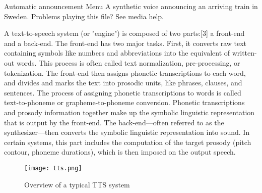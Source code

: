 \documentclass[12pt,a4paper]{article}
\begin{document}
Automatic announcement
Menu
A synthetic voice announcing an arriving train in Sweden.
Problems playing this file? See media help.

A text-to-speech system (or "engine") is composed of two parts:[3] a front-end and a back-end. The front-end has two major tasks. First, it converts raw text containing symbols like numbers and abbreviations into the equivalent of written-out words. This process is often called text normalization, pre-processing, or tokenization. The front-end then assigns phonetic transcriptions to each word, and divides and marks the text into prosodic units, like phrases, clauses, and sentences. The process of assigning phonetic transcriptions to words is called text-to-phoneme or grapheme-to-phoneme conversion. Phonetic transcriptions and prosody information together make up the symbolic linguistic representation that is output by the front-end. The back-end—often referred to as the synthesizer—then converts the symbolic linguistic representation into sound. In certain systems, this part includes the computation of the target prosody (pitch contour, phoneme durations), which is then imposed on the output speech. 

\newpage

\begin{figure}[h]
	\centering
	\texttt{[image: tts.png]}
	\caption{Overview of a typical TTS system}
\end{figure}


\newpage
\end{document}
